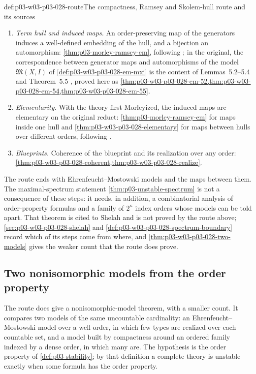 \begin{hbmethod}{def:p03-w03-p03-028-route}{The compactness, Ramsey and Skolem-hull route and its sources}
\begin{enumerate}
with open theories and reduce the general case to that one by their
Theorems~1.1 and~4.2 \cite[p.~62]{EhrenfeuchtMostowski1956}; see
\cref{thm:p03-w03-p03-028-em-11,thm:p03-w03-p03-028-em-41,thm:p03-w03-p03-028-em-open-reduction}.
\item \emph{Term hull and induced maps.}  An order-preserving map of the
generators induces a well-defined embedding of the hull, and a bijection an
automorphism: \cref{thm:p03-morley-ramsey-em}, following
\cite[Theorems~3.4--3.5, p.~527]{Morley1965}; in the original, the
correspondence between generator maps and automorphisms of the model
\(\mathfrak M(X,I)\) of \cref{def:p03-w03-p03-028-em-mxi} is the content
of Lemmas~5.2--5.4 and Theorem~5.5
\cite[pp.~57--60]{EhrenfeuchtMostowski1956}, proved here as
\cref{thm:p03-w03-p03-028-em-52,thm:p03-w03-p03-028-em-54,thm:p03-w03-p03-028-em-55}.
\item \emph{Elementarity.}  With the theory first Morleyized, the induced
maps are elementary on the original reduct: \cref{thm:p03-morley-ramsey-em}
for maps inside one hull and \cref{thm:p03-w03-p03-028-elementary} for
maps between hulls over different orders,
following \cite[Theorem~3.6, p.~527]{Morley1965}.
\item \emph{Blueprints.}  Coherence of the blueprint and its realization
over any order:
\cref{thm:p03-w03-p03-028-coherent,thm:p03-w03-p03-028-realize}.
\end{enumerate}
The route ends with Ehrenfeucht--Mostowski models and the maps between
them.  The maximal-spectrum statement \cref{thm:p03-unstable-spectrum} is
not a consequence of these steps: it needs, in addition, a combinatorial
analysis of order-property formulas and a family of \(2^\kappa\) index
orders whose models can be told apart.  That theorem is cited to Shelah and
is not proved by the route above; \cref{sec:p03-w03-p03-028-shelah} and
\cref{def:p03-w03-p03-028-spectrum-boundary} record which of its steps
come from where, and \cref{thm:p03-w03-p03-028-two-models} gives the
weaker count that the route does prove.
\end{hbmethod}

\subsection{Two nonisomorphic models from the order property}
\label{sec:p03-w03-p03-028-two-models}

The route does give a nonisomorphic-model theorem, with a smaller count.
It compares two models of the same uncountable cardinality: an
Ehrenfeucht--Mostowski model over a well-order, in which few types are
realized over each countable set, and a model built by compactness around
an ordered family indexed by a dense order, in which many are.  The
hypothesis is the order property of \cref{def:p03-stability}; by that
definition a complete theory is unstable exactly when some formula has the
order property.

